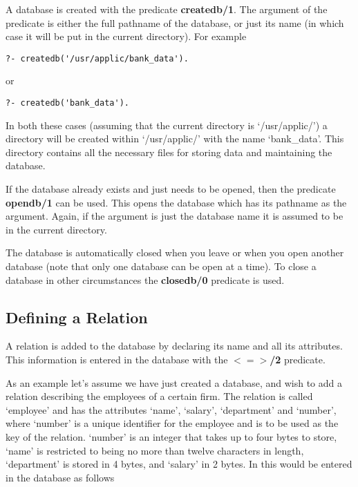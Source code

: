 A database is created with the predicate {\bf createdb/1}. 
The argument of the predicate is either the 
full pathname of the database, or just its name 
(in which case it will be put in the current directory).
For example  

\begin{verbatim}
?- createdb('/usr/applic/bank_data').
\end{verbatim}
or
\begin{verbatim}
?- createdb('bank_data').
\end{verbatim}

In both these cases (assuming that the current
directory is `/usr/applic/') a directory will
be created within `/usr/applic/' with the name `bank\_data'. 
This directory contains all the necessary files for storing
data and maintaining the database.

If the database already exists and just needs to be opened, then the 
predicate {\bf opendb/1}  can be used. 
This opens the database which has its pathname as the argument.
Again, if the argument is just the database name it is assumed
to be in the current directory.

The database is automatically closed when you leave \eclipse or
when you open another database (note that only one database
can be open at a time).  To close a database in other circumstances the 
{\bf closedb/0}  predicate is used.

\subsection{Defining a Relation}	
A relation is added to the database by declaring its name and all its 
attributes. This information is entered in the database with the 
{\bf $<=>$/2} predicate. 

As an example let's assume we have just created a database,
and wish to add a relation describing the employees of a certain 
firm. The relation is called `employee' and has the 
attributes `name', `salary',  `department' and
`number', where `number' is a unique identifier for the employee
and is to be used as the key of the relation. `number' is an integer
that takes up to four bytes to store, `name' is restricted to being
no more than twelve characters in length, `department' is stored in 4  bytes,
and `salary' in 2 bytes.  In \eclipse this would be entered in the
database as follows

